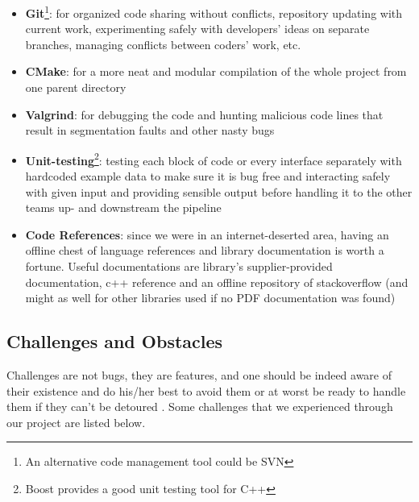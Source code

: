 \begin{itemize}
  \item \textbf{Git}\footnote{An alternative code management tool could be SVN}: for organized code sharing without conflicts, repository updating with current work, experimenting safely with developers' ideas on separate branches, managing conflicts between coders' work, etc.
  \item \textbf{CMake}: for a more neat and modular compilation of the whole project from one parent directory
  \item \textbf{Valgrind}: for debugging the code and hunting malicious code lines that result in segmentation faults and other nasty bugs
  \item \textbf{Unit-testing}\footnote{Boost provides a good unit testing tool for C++}: testing each block of code or every interface separately with hardcoded example data to make sure it is bug free and interacting safely with given input and providing sensible output before handling it to the other teams up- and downstream the pipeline\label{unit_testing}
  \item \textbf{Code References}: since we were in an internet-deserted area, having an offline chest of language references and library documentation is worth a fortune. Useful documentations are library's supplier-provided documentation, c++ reference and an offline repository of stackoverflow (and might as well for other libraries used if no PDF documentation was found)
\end{itemize}

\subsection{Challenges and Obstacles}
Challenges are not bugs, they are features, and one should be indeed aware of their existence and do his/her best to avoid them or at worst be ready to handle them if they can't be detoured . Some challenges that we experienced through our project are listed below.


